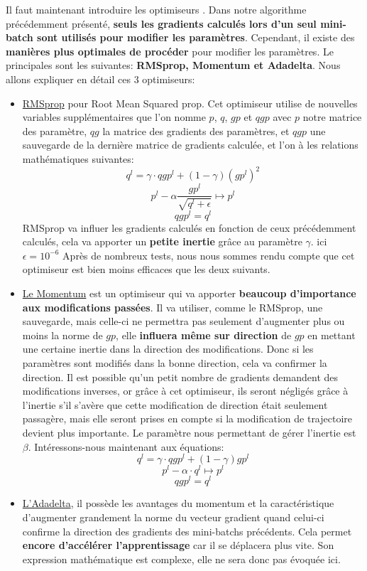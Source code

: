 \documentclass[12pt,a4paper]{extarticle}
\begin{document}
Il faut maintenant introduire les optimiseurs \cite{optimiseur1}. Dans notre algorithme précédemment présenté, \textbf{seuls les gradients calculés lors d'un seul mini-batch sont utilisés pour modifier les paramètres}. Cependant, il existe des \textbf{manières plus optimales de procéder} pour modifier les paramètres. Le principales sont les suivantes:\textbf{ RMSprop, Momentum et Adadelta}. Nous allons expliquer en détail ces 3 optimiseurs:
\begin{itemize}
\item \underline{RMSprop} pour Root Mean Squared  prop. Cet optimiseur utilise de nouvelles variables supplémentaires que l'on nomme $p$, $q$, $gp$ et $qgp$ avec $p$ notre matrice des paramètre, $qg$ la matrice des gradients des paramètres, et $qgp$ une sauvegarde de la dernière matrice de gradients calculée, et l'on à les relations mathématiques suivantes:
\[q^l=\gamma \cdot qgp^l+(1-\gamma)(gp^{l})^2\]
\[p^l - \alpha \frac{gp^l}{\sqrt{q^l+\epsilon}}\mapsto p^l \]
\[qgp^l = q^l \]
RMSprop va influer les gradients calculés en fonction de ceux précédemment calculés, cela va apporter un \textbf{petite inertie }grâce au paramètre $\gamma$. ici $\epsilon = 10^{-6}$
Après de nombreux tests, nous nous sommes rendu compte que cet optimiseur est bien moins efficaces que les deux suivants. 

\item\underline{Le Momentum} est un optimiseur qui va apporter \textbf{beaucoup d'importance aux modifications passées}. Il va utiliser, comme le RMSprop, une sauvegarde, mais celle-ci ne permettra pas seulement d'augmenter plus ou moins la norme de $gp$, elle \textbf{influera même sur direction} de $gp$ en mettant une certaine inertie dans la direction des modifications. Donc si les paramètres sont modifiés dans la bonne direction, cela va confirmer la direction. Il est possible qu'un petit nombre de gradients demandent des modifications inverses, or grâce à cet optimiseur, ils seront négligés grâce à l'inertie s'il s'avère que cette modification de direction était seulement passagère, mais elle seront prises en compte si la modification de trajectoire devient plus importante. Le paramètre nous permettant de gérer l'inertie est $\beta$. Intéressons-nous maintenant aux équations:
\[q^l=\gamma\cdot qgp^l+(1-\gamma)gp^l\]
\[p^l - \alpha \cdot q^l \mapsto p^l \]
\[qgp^l = q^l \]

\item \underline{L'Adadelta}, il possède les avantages du momentum et la caractéristique d'augmenter grandement la norme du vecteur gradient quand celui-ci confirme la direction des gradients des mini-batchs précédents. Cela permet \textbf{encore d'accélérer l'apprentissage} car il se déplacera plus vite. Son expression mathématique est complexe, elle ne sera donc pas évoquée ici. 

\end{itemize} 
\end{document}
